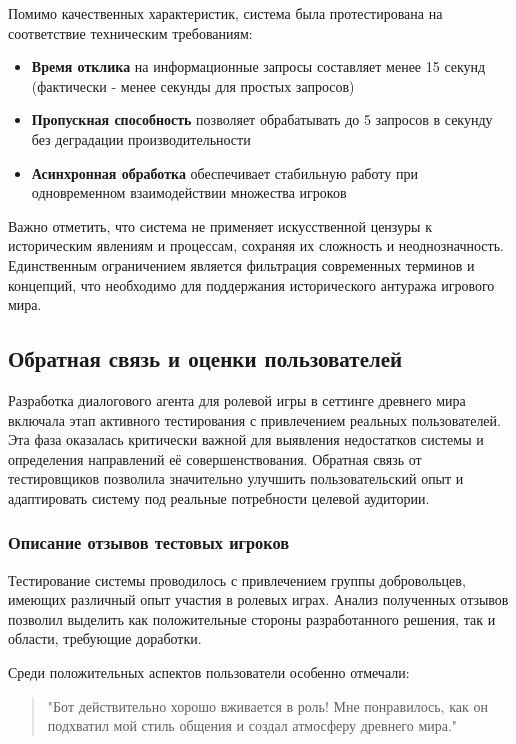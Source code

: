 Помимо качественных характеристик, система была протестирована на соответствие техническим требованиям:

\begin{itemize}
\item \textbf{Время отклика} на информационные запросы составляет менее 15 секунд (фактически - менее секунды для простых запросов)
\item \textbf{Пропускная способность} позволяет обрабатывать до 5 запросов в секунду без деградации производительности
\item \textbf{Асинхронная обработка} обеспечивает стабильную работу при одновременном взаимодействии множества игроков
\end{itemize}

Важно отметить, что система не применяет искусственной цензуры к историческим явлениям и процессам, сохраняя их сложность и неоднозначность. Единственным ограничением является фильтрация современных терминов и концепций, что необходимо для поддержания исторического антуража игрового мира.

\subsection{Обратная связь и оценки пользователей}

Разработка диалогового агента для ролевой игры в сеттинге древнего мира включала этап активного тестирования с привлечением реальных пользователей. Эта фаза оказалась критически важной для выявления недостатков системы и определения направлений её совершенствования. Обратная связь от тестировщиков позволила значительно улучшить пользовательский опыт и адаптировать систему под реальные потребности целевой аудитории.

\subsubsection{Описание отзывов тестовых игроков}

Тестирование системы проводилось с привлечением группы добровольцев, имеющих различный опыт участия в ролевых играх. Анализ полученных отзывов позволил выделить как положительные стороны разработанного решения, так и области, требующие доработки.

Среди положительных аспектов пользователи особенно отмечали:

\begin{quote}
"Бот действительно хорошо вживается в роль! Мне понравилось, как он подхватил мой стиль общения и создал атмосферу древнего мира."
\end{quote}

